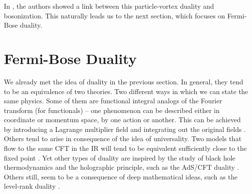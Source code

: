 In \cite{Karch:2016sxi}, the authors showed a link between this particle-vortex duality and bosonization. This naturally leads us to the next section, which focuses on Fermi-Bose duality.
%

        \section{Fermi-Bose Duality} \label{Fermi-Bose_sec}
        We already met the idea of duality in the previous section. In general, they tend to be an equivalence of two theories. Two different ways in which we can state the same physics. Some of them are functional integral analogs of the Fourier transform (for functionals) -- one phenomenon can be described either in coordinate or momentum space, by one action or another. This can be achieved by introducing a Lagrange multiplier field and integrating out the original fields \textcolor{red}{\cite{Barci:1995iy, Burgess:1993np}}. Others tend to arise in consequence of the idea of universality. Two models that flow to the same CFT in the IR will tend to be equivalent sufficiently close to the fixed point \textcolor{red}{\cite{Seiberg:1994bz, Seiberg:1994rs}}.
        Yet other types of duality are inspired by the study of black hole thermodynamics and the holographic principle, such as the AdS/CFT duality \textcolor{red}{\cite{Maldacena:1997re}}. Others still, seem to be a consequence of deep mathematical ideas, such as the level-rank duality \textcolor{red}{\cite{Nakanishi:1990hj, Mlawer:1990uv, Naculich:2007nc, Naculich:1990pa, Camperi:1990dk}}.

